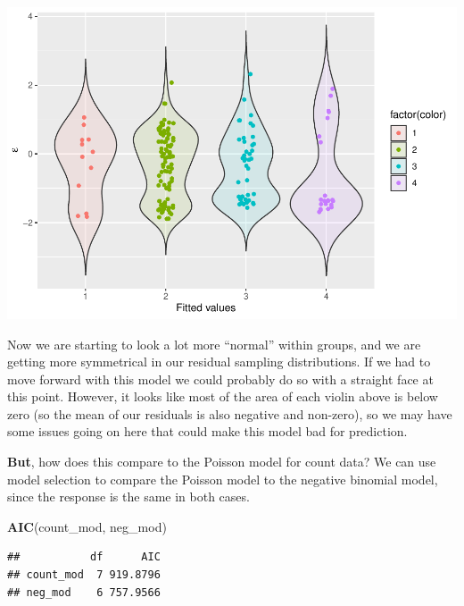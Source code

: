 \documentclass[
]{book}
\newenvironment{Shaded}{\begin{snugshade}}{\end{snugshade}}
\newcommand{\KeywordTok}[1]{\textcolor[rgb]{0.13,0.29,0.53}{\textbf{#1}}}
\newcommand{\NormalTok}[1]{#1}
\begin{document}
\includegraphics{worstr_files/figure-latex/unnamed-chunk-357-1.pdf}

Now we are starting to look a lot more ``normal'' within groups, and we are getting more symmetrical in our residual sampling distributions. If we had to move forward with this model we could probably do so with a straight face at this point. However, it looks like most of the area of each violin above is below zero (so the mean of our residuals is also negative and non-zero), so we may have some issues going on here that could make this model bad for prediction.

\textbf{But}, how does this compare to the Poisson model for count data? We can use model selection to compare the Poisson model to the negative binomial model, since the response is the same in both cases.

\begin{Shaded}
\begin{Highlighting}[]
\KeywordTok{AIC}\NormalTok{(count_mod, neg_mod)}
\end{Highlighting}
\end{Shaded}

\begin{verbatim}
##           df      AIC
## count_mod  7 919.8796
## neg_mod    6 757.9566
\end{verbatim}
\end{document}
